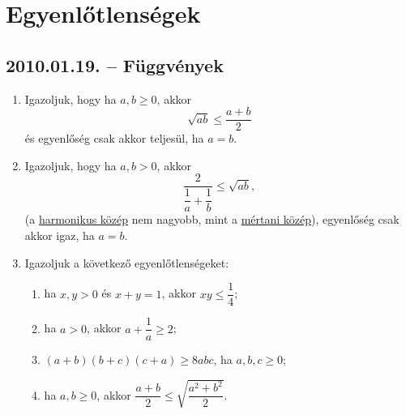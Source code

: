 \documentclass{article}
\newenvironment{abc}{\begin{enumerate}[label=\textit{\alph*})]}{\end{enumerate}}
\begin{document}
\section*{Egyenlőtlenségek}

\subsection*{2010.01.19. -- Függvények}
\begin{enumerate}
\item Igazoljuk, hogy ha $a,b \ge 0$, akkor  $$\sqrt{ab}\le \dfrac{a+b}{2}$$
és egyenlőség csak akkor teljesül, ha $a=b$.
\item Igazoljuk, hogy ha $a,b > 0$, akkor  $$\frac{2}{\dfrac{1}{a}+\dfrac{1}{b}}\le \sqrt{ab},$$
(a \underline{harmonikus közép} nem nagyobb, mint a \underline{mértani közép}),
egyenlőség csak akkor igaz, ha $a=b$.
\item Igazoljuk a következő egyenlőtlenségeket:
\begin{abc}
\item ha $x,y>0$ és $x+y=1$, akkor $xy\le\dfrac{1}{4}$;
\item ha $a>0$, akkor $a+\dfrac{1}{a}\ge 2$;
\item $(a+b)(b+c)(c+a)\ge 8abc$, ha $a,b,c\ge 0$;
\item ha $a,b\ge 0$, akkor $\dfrac{a+b}{2}\le \sqrt{\dfrac{a^2+b^2}{2}}$.
\end{abc}
\end{enumerate}
\end{document}
